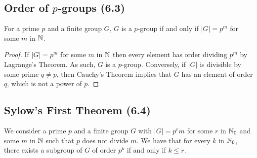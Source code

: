 \subsection{Order of $p$-groups (6.3)} \label{6.3}

For a prime $p$ and a finite group $G$, $G$ is a $p$-group if
and only if $|G| = p^m$ for some $m$ in $\mathbb{N}$.

\begin{proof}
    If $|G| = p^m$ for some $m$ in $\mathbb{N}$ then every element has
    order dividing $p^m$ by Lagrange's Theorem. As such, $G$ is a
    $p$-group. Conversely, if $|G|$ is divisible by some prime
    $q \neq p$, then Cauchy's Theorem implies that $G$ has
    an element of order $q$, which is not a power of $p$.
\end{proof}

\subsection{Sylow's First Theorem (6.4)} \label{6.4}

We consider a prime $p$ and a finite group $G$ with $|G| = p^rm$ 
for some $r$ in $\mathbb{N}_0$ and some $m$ in $\mathbb{N}$ such that $p$ 
does not divide $m$. We have that for every $k$ in $\mathbb{N}_0$,
there exists a subgroup of $G$ of order $p^k$ if and only if
$k \leq r$.

